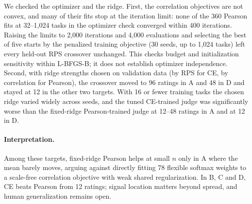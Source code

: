 We checked the optimizer and the ridge.
First, the correlation objectives are not convex, and many of their fits stop at the iteration limit: none of the 360 Pearson fits at 32--1,024 tasks in the optimizer check converged within 400 iterations.
Raising the limits to 2,000 iterations and 4,000 evaluations and selecting the best of five starts by the penalized training objective (30 seeds, up to 1,024 tasks) left every held-out RPS crossover unchanged.
This checks budget and initialization sensitivity within L-BFGS-B; it does not establish optimizer independence.
Second, with ridge strengths chosen on validation data (by RPS for CE, by correlation for Pearson), the crossover moved to 96 ratings in A and 48 in D and stayed at 12 in the other two targets.
With 16 or fewer training tasks the chosen ridge varied widely across seeds, and the tuned CE-trained judge was significantly worse than the fixed-ridge Pearson-trained judge at 12--48 ratings in A and at 12 in D.

\paragraph{Interpretation.}
Among these targets, fixed-ridge Pearson helps at small $n$ only in A where the mean barely moves, arguing against directly fitting 78 flexible softmax weights to a scale-free correlation objective with weak shared regularization.
In B, C and D, CE beats Pearson from 12 ratings; signal location matters beyond spread, and human generalization remains open.
